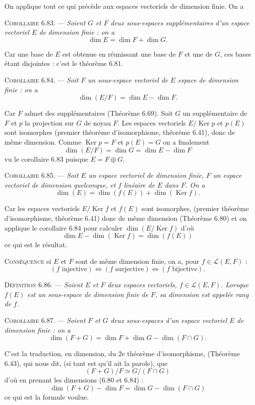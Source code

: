 On applique tout ce qui précède aux espaces vectoriels de dimension finie. On a

\medskip\noindent\textsc{Corollaire 6.83.} --- \emph{Soient $G$ et $F$ deux sous-espaces supplémentaires d'un espace vectoriel $E$ de dimension finie : on a
\[
\dim E=\dim F+\dim G.
\]}

Car une base de $E$ est obtenue en réunissant une base de $F$ et une de $G$, ces bases étant disjointes : c'est le théorème 6.81. \bookend

\medskip\noindent\textsc{Corollaire 6.84.} --- \emph{Soit $F$ un sous-espace vectoriel de $E$ espace de dimension finie : on a
\[
\dim(E/F)=\dim E-\dim F.
\]}

Car $F$ admet des supplémentaires (Théorème 6.69). Soit $G$ un supplémentaire de $F$ et $p$ la projection sur $G$ de noyau $F$. Les espaces vectoriels $E/\operatorname{Ker} p$ et $p(E)$ sont isomorphes (premier théorème d'isomorphisme, théorème 6.41), donc de même dimension. Comme $\operatorname{Ker} p=F$ et $p(E)=G$ on a finalement
\[
\dim(E/F)=\dim G=\dim E-\dim F
\]
vu le corollaire 6.83 puisque $E=F\oplus G$. \bookend

\medskip\noindent\textsc{Corollaire 6.85.} --- \emph{Soit $E$ un espace vectoriel de dimension finie, $F$ un espace vectoriel de dimension quelconque, et $f$ linéaire de $E$ dans $F$. On a
\[
\dim(E)=\dim(f(E))+\dim(\operatorname{Ker} f).
\]}

Car les espaces vectoriels $E/\operatorname{Ker} f$ et $f(E)$ sont isomorphes, (premier théorème d'isomorphisme, théorème 6.41) donc de même dimension (Théorème 6.80) et on applique le corollaire 6.84 pour calculer $\dim(E/\operatorname{Ker} f)$ d'où
\[
\dim E-\dim(\operatorname{Ker} f)=\dim(f(E))
\]
ce qui est le résultat. \bookend

\textsc{Conséquence} si $E$ et $F$ sont de même dimension finie, on a, pour $f\in\mathcal L(E,F)$ :
\[
(f\text{ injective})\Longleftrightarrow(f\text{ surjective})\Longleftrightarrow(f\text{ bijective}).
\]

\medskip\noindent\textsc{Définition 6.86.} --- \emph{Soient $E$ et $F$ deux espaces vectoriels, $f\in\mathcal L(E,F)$. Lorsque $f(E)$ est un sous-espace de dimension finie de $F$, sa dimension est appelée rang de $f$.}

\medskip\noindent\textsc{Corollaire 6.87.} --- \emph{Soient $F$ et $G$ deux sous-espaces d'un espace vectoriel $E$ de dimension finie : on a
\[
\dim(F+G)=\dim F+\dim G-\dim(F\cap G).
\]}

C'est la traduction, en dimension, du 2e théorème d'isomorphisme, (Théorème 6.43), qui nous dit, (si tant est qu'il ait la parole), que
\[
(F+G)/F\simeq G/(F\cap G)
\]
d'où en prenant les dimensions (6.80 et 6.84) :
\[
\dim(F+G)-\dim F=\dim G-\dim(F\cap G)
\]
ce qui est la formule voulue. \bookend

